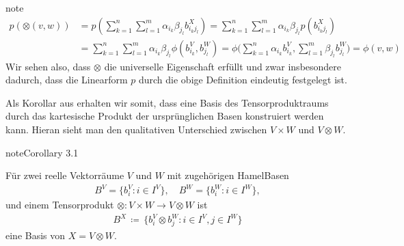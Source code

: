 \documentclass[letterpaper,10pt,english]{jupyterBook}
\begin{document}
\begin{sphinxadmonition}{note}
\begin{equation*}
\begin{split}p(\otimes(v,w))
&= p \left( \sum_{k=1}^n \sum_{l=1}^m \alpha_{i_k} \beta_{j_l} b_{i_kj_l}^X \right)
= \sum_{k=1}^n \sum_{l=1}^m \alpha_{i_k} \beta_{j_l} p(b_{i_kj_l}^X) \\
&= \sum_{k=1}^n \sum_{l=1}^m \alpha_{i_k} \beta_{j_l} \phi\left(b_{i_k}^V, b_{j_l}^W\right)
= \phi\big(\sum_{k=1}^n \alpha_{i_k} b_{i_k}^V,\sum_{l=1}^m \beta_{j_l} b_{j_l}^W\big)
= \phi(v,w)\end{split}
\end{equation*}
\sphinxAtStartPar
Wir sehen also, dass \(\otimes\) die universelle Eigenschaft erfüllt und zwar insbesondere dadurch, dass die Linearform \(p\) durch die obige Definition eindeutig festgelegt ist.
\end{sphinxadmonition}

\sphinxAtStartPar
Als Korollar aus {\hyperref[\detokenize{vektoranalysis/tensor:thm:existenzTensorprodukt}]{}} erhalten wir somit, dass eine Basis des Tensorproduktraums durch das kartesische Produkt der ursprünglichen Basen konstruiert werden kann.
Hieran sieht man den qualitativen Unterschied zwischen \(V \times W\) und \(V\otimes W\).
\label{vektoranalysis/tensor:corollary-6}
\begin{sphinxadmonition}{note}{Corollary 3.1}



\sphinxAtStartPar
Für zwei reelle Vektorräume \(V\) und \(W\) mit zugehörigen Hamel\sphinxhyphen{}Basen
\begin{equation*}
\begin{split}B^V = \{b_i^V: i\in I^V\}, \quad B^W = \{b_i^W: i\in I^W\},\end{split}
\end{equation*}
\sphinxAtStartPar
und einem Tensorprodukt \(\otimes:V\times W \to V\otimes W\) ist
\begin{equation*}
\begin{split}B^X \, \coloneqq \, \{b_i^V \otimes b_j^W: i\in I^V, j\in I^W\}\end{split}
\end{equation*}
\sphinxAtStartPar
eine Basis von \(X = V\otimes W\).
\end{sphinxadmonition}
\end{document}

